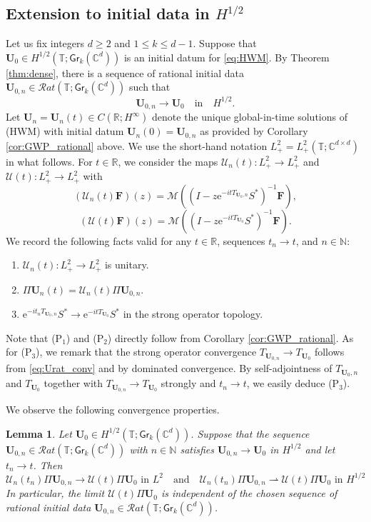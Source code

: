 \documentclass[10pt,reqno,a4paper]{amsart}
\newtheorem{lem}{Lemma}[section]
\theoremstyle{definition}
\theoremstyle{remark}
\theoremstyle{remark}
\numberwithin{equation}{section}
\newcommand{\C}{\mathbb{C}}
\newcommand{\N}{\mathbb{N}}
\newcommand{\R}{\mathbb{R}}
\newcommand{\T}{\mathbb{T}}
\newcommand{\Mean}{\mathscr{M}}
\newcommand{\be}{\begin{equation}}
\newcommand{\ee}{\end{equation}}
\newcommand{\weakto}{\rightharpoonup}
\newcommand{\eu}{\mathrm{e}}
\newcommand{\Ub}{\mathbf{U}}
\newcommand{\Fb}{\mathbf{F}}
\newcommand{\id}{I}
\newcommand{\Gr}{\mathsf{Gr}}
\newcommand{\Us}{\mathscr{U}}
\begin{document}
\subsection{Extension to initial data in $H^{1/2}$} 
Let us fix integers $d \geq 2$ and $1 \leq k \leq d-1$. Suppose that $\Ub_0 \in H^{1/2}(\T; \Gr_k(\C^d))$ is an initial datum for \eqref{eq:HWM}.  By Theorem \ref{thm:dense}, there is a sequence of rational initial data $\Ub_{0,n} \in \mathcal{R}at(\T; \Gr_k(\C^d))$ such that 
\be \label{eq:Urat_conv}
\Ub_{0,n} \to \Ub_0 \quad \mbox{in} \quad H^{1/2}.
\ee
Let $\Ub_n = \Ub_n(t) \in C(\R; H^\infty)$ denote the unique global-in-time solutions of (HWM) with initial datum $\Ub_n(0) = \Ub_{0,n}$ as provided by Corollary \ref{cor:GWP_rational} above. We use the short-hand notation $L^2_+ = L^2_+(\T; \C^{d \times d})$ in what follows. For $t \in \R$, we consider the maps $\Us_n(t)  : L^2_+ \to L^2_+$ and $\Us(t) : L^2_+ \to L^2_+$ with
$$
(\Us_n(t) \Fb)(z) = \Mean \left ( ( \id - z \eu^{-it T_{\Ub_0,n}} S^*)^{-1} \Fb \right ), 
$$
$$ 
(\Us(t) \Fb)(z) = \Mean \left ((\id - z \eu^{-it T_{\Ub_0}} S^*)^{-1} \Fb \right ).
$$
We record the following facts valid for any $t \in \R$, sequences $t_n \to t$, and $n \in \N$:
\begin{enumerate}
\item[(P$_1$)] $\Us_n(t) : L^2_+ \to L^2_+$ is unitary.
\item[(P$_2$)] $\Pi \Ub_n(t) = \Us_n(t) \Pi \Ub_{0,n}$.
\item[(P$_3$)] $\eu^{-i t_n T_{\Ub_0,n}} S^*  \to  \eu^{-it T_{\Ub_0}} S^*$ in the strong operator topology.
\end{enumerate}
Note that (P$_1$) and (P$_2$) directly follow from Corollary \ref{cor:GWP_rational}. As for (P$_3$), we remark that the strong operator convergence $T_{\Ub_{0,n}} \to T_{\Ub_0}$ follows from \eqref{eq:Urat_conv} and  by dominated convergence. By self-adjointness of $T_{\Ub_0,n}$ and $T_{\Ub_0}$ together with $T_{\Ub_{0,n}} \to T_{\Ub_0}$ strongly and $t_n \to t$, we easily deduce (P$_3$).

We observe the following convergence properties.
\begin{lem} \label{lem:GWP_minor}
Let $\Ub_0 \in H^{1/2}(\T; \Gr_k(\C^d))$. Suppose that the sequence $\Ub_{0,n} \in \mathcal{R}at(\T; \Gr_k(\C^d))$ with $n \in \N$ satisfies $\Ub_{0,n} \to \Ub_0$ in $H^{1/2}$ and let $t_n \to t$. Then 
$$
\mbox{$\Us_n(t_n) \Pi \Ub_{0,n} \to \Us(t) \Pi \Ub_0$ in $L^2$} \quad \mbox{and} \quad \mbox{$\Us_n(t_n) \Pi \Ub_{0,n} \weakto \Us(t) \Pi \Ub_0$ in $H^{1/2}$}
$$
In particular, the limit $\Us(t) \Pi \Ub_0$ is independent of the chosen sequence of rational initial data $\Ub_{0,n} \in \mathcal{R}at(\T; \Gr_k(\C^d))$. 
\end{lem}
\end{document}
